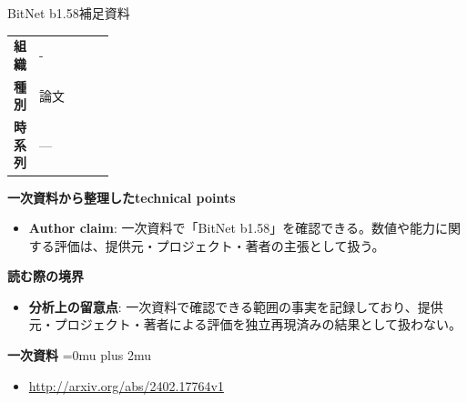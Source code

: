 \begin{technicalnote}{BitNet b1.58}{補足資料}
\begingroup
\begin{tabularx}{\linewidth}{@{}>{\bfseries}p{0.22\linewidth}X@{}}
組織 & - \\
種別 & 論文 \\
時系列 & — \\
\end{tabularx}
\smallskip
{\bfseries 一次資料から整理したtechnical points}
\begin{itemize}[leftmargin=1.5em,itemsep=0.35em]
\item \textbf{Author claim}: 一次資料で「BitNet b1.58」を確認できる。数値や能力に関する評価は、提供元・プロジェクト・著者の主張として扱う。
\end{itemize}
\begin{minipage}{\linewidth}
{\bfseries 読む際の境界}
\begin{itemize}[leftmargin=1.5em,itemsep=0.35em]
\item \textbf{分析上の留意点}: 一次資料で確認できる範囲の事実を記録しており、提供元・プロジェクト・著者による評価を独立再現済みの結果として扱わない。
\end{itemize}
\begin{samepage}
{\bfseries 一次資料}
\begingroup\sloppy
\Urlmuskip=0mu plus 2mu\relax
\begin{itemize}[leftmargin=1.5em,itemsep=0.25em]
\item {\scriptsize\url{http://arxiv.org/abs/2402.17764v1}}
\end{itemize}
\endgroup
\end{samepage}
\end{minipage}
\endgroup
\end{technicalnote}
\medskip
